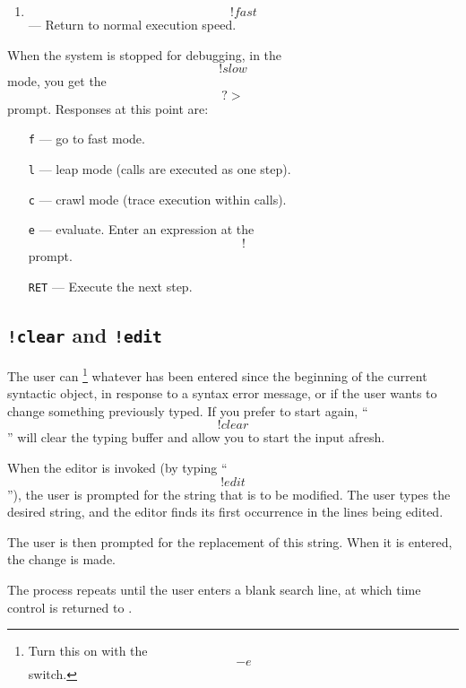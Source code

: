 {\begin{enumerate}
\item{}
\[!fast\] --- Return to normal execution speed.

\end{enumerate}

When the system is stopped for debugging, in the \[!slow\] mode, you
get the \[?>\] prompt.
Responses at this point are:
\begin{itemize}
\item[\tt f] --- go to fast mode.
\item[\tt l] --- leap mode (calls are executed as one step).
\item[\tt c] --- crawl mode (trace execution within calls).
\item[\tt e] --- evaluate.  Enter an expression at the \[!\] prompt.
\item[\tt RET] --- Execute the next step.
\end{itemize}

\pagebreak[0]
\subsection{{\tt !clear} and {\tt !edit}}

\begin{enumerate}

\begin{sloppypar}
\item
The user can \footnote{%
Turn this on with the \[-e\] switch.}
whatever has been entered since the beginning of the
current syntactic object,
in response to a syntax error message, or if the user wants to change
something previously typed.
If you prefer to start again,
``\[!clear\]'' will clear the typing buffer and allow you to start the
input afresh.
\end{sloppypar}

\item
When the editor is invoked
(by typing ``\[!edit\]''), the user is prompted for the string that is to
be modified.  The user types the desired string, and the editor finds its
first occurrence in the lines being edited.

\item
The user is then prompted for the replacement of this string.  When it is
entered, the change is made.

\item
The process repeats until the user enters a blank search line,
at which time control is returned to \ISETL{}\@.
\end{enumerate}

}
